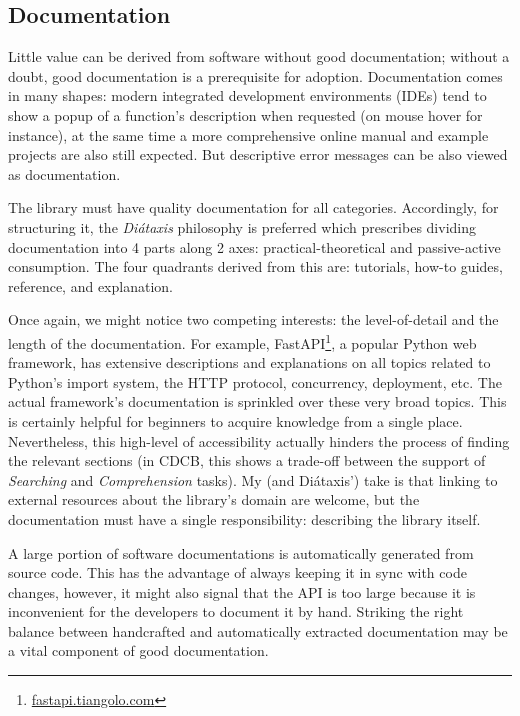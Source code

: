 \subsection{Documentation}

Little value can be derived from software without good documentation; without a doubt, good documentation is a prerequisite for adoption. Documentation comes in many shapes: modern integrated development environments (IDEs) tend to show a popup of a function's description when requested (on mouse hover for instance), at the same time a more comprehensive online manual and example projects are also still expected. But descriptive error messages can be also viewed as documentation. 

The library must have quality documentation for all categories. Accordingly, for structuring it, the \textit{Diátaxis} philosophy is preferred \cite{Procida_Diataxis_documentation_framework} which prescribes dividing documentation into 4 parts along 2 axes: practical-theoretical and passive-active consumption. The four quadrants derived from this are: tutorials, how-to guides, reference, and explanation.

Once again, we might notice two competing interests: the level-of-detail and the length of the documentation. For example, FastAPI\footnote{\href{https://fastapi.tiangolo.com/async/\#concurrent-burgers}{fastapi.tiangolo.com}}, a popular Python web framework, has extensive descriptions and explanations on all topics related to Python's import system, the HTTP protocol, concurrency, deployment, etc. The actual framework's documentation is sprinkled over these very broad topics. This is certainly helpful for beginners to acquire knowledge from a single place. Nevertheless, this high-level of accessibility actually hinders the process of finding the relevant sections (in CDCB, this shows a trade-off between the support of \textit{Searching} and \textit{Comprehension} tasks). My (and Diátaxis') take is that linking to external resources about the library's domain are welcome, but the documentation must have a single responsibility: describing the library itself.

A large portion of software documentations is automatically generated from source code. This has the advantage of always keeping it in sync with code changes, however, it might also signal that the API is too large because it is inconvenient for the developers to document it by hand. Striking the right balance between handcrafted and automatically extracted documentation may be a vital component of good documentation.

